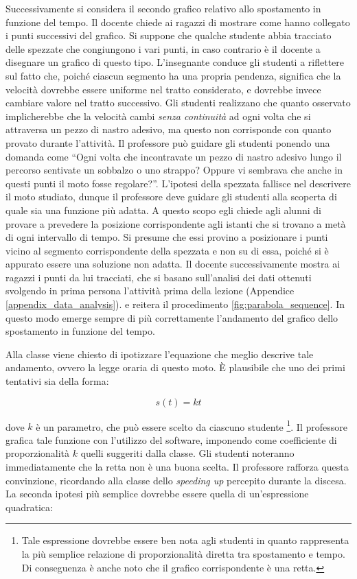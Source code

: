 \documentclass{report} \usepackage[T1]{fontenc} \usepackage[italian]{babel}
\begin{document}
Successivamente si considera il secondo grafico relativo allo spostamento in
funzione del tempo. Il docente chiede ai ragazzi di mostrare come hanno
collegato i punti successivi del grafico. Si suppone che qualche studente abbia
tracciato delle spezzate che congiungono i  vari punti, in caso contrario è il
docente a disegnare un grafico di questo tipo. L’insegnante conduce gli studenti a
riflettere sul fatto che, poiché ciascun segmento ha una propria pendenza,
significa che la velocità dovrebbe essere uniforme nel tratto considerato, e dovrebbe
invece cambiare valore nel tratto successivo. Gli studenti realizzano che
quanto osservato implicherebbe che la velocità cambi \emph{senza continuità}
ad ogni volta che si attraversa un pezzo di nastro adesivo, ma questo non
corrisponde con quanto provato durante l’attività.
Il professore può guidare gli studenti ponendo una domanda come
``Ogni volta che incontravate un pezzo di nastro adesivo lungo il percorso
sentivate un sobbalzo o uno strappo? Oppure vi sembrava che anche in questi
punti il moto fosse regolare?''.
L’ipotesi della spezzata
fallisce nel descrivere il moto studiato, dunque il professore deve guidare gli
studenti alla scoperta di quale sia una funzione più adatta. A questo scopo egli
chiede agli alunni di provare a prevedere la posizione corrispondente  agli
istanti che si trovano a metà di ogni intervallo di tempo.
Si presume che essi provino a posizionare i punti vicino al segmento
corrispondente della spezzata e non su di essa, poiché si è appurato essere una
soluzione non adatta. Il docente successivamente mostra ai ragazzi i punti da
lui tracciati, che si basano sull’analisi dei dati ottenuti svolgendo in prima
persona l’attività prima della lezione (Appendice \ref{appendix_data_analysis}).
e reitera il procedimento \ref{fig:parabola_sequence}.
In questo modo emerge sempre di più correttamente l’andamento del grafico
dello spostamento in funzione del tempo.

Alla classe viene chiesto di ipotizzare
l’equazione che meglio descrive tale andamento, ovvero la legge oraria di questo moto.
\`E plausibile che uno dei primi tentativi sia della forma:

\begin{equation}
s(t) = kt
\end{equation}

dove $k$ è un parametro, che può essere scelto da ciascuno studente
\footnote{
          Tale espressione dovrebbe essere ben nota agli
          studenti in quanto rappresenta la più semplice relazione di proporzionalità
          diretta tra spostamento e tempo. Di conseguenza è anche noto che il grafico
          corrispondente è una retta.
         }.
Il professore grafica tale funzione con l’utilizzo del software,
imponendo come coefficiente di proporzionalità $k$ quelli suggeriti dalla classe.
Gli studenti noteranno immediatamente che la retta non è una buona scelta.
Il professore rafforza questa convinzione, ricordando alla classe dello
\emph{speeding up} percepito durante la discesa.
La seconda ipotesi più semplice dovrebbe essere quella di un'espressione quadratica:
\end{document}
